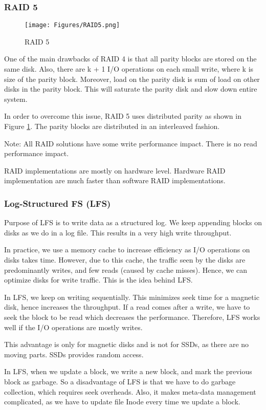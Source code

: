 \documentclass[twoside]{article}
\begin{document}
\subsubsection{RAID 5}
\begin{figure}[htbp]
\centering
\texttt{[image: Figures/RAID5.png]}
\caption{RAID 5} \label{fig:RAID5}
\end{figure}
One of the main drawbacks of RAID 4 is that all parity blocks are stored on the same disk. Also, there are k + 1 I/O operations on each small write, where k is size of the parity block. Moreover, load on the parity disk is sum of load on other disks in the parity block. This will saturate the parity disk and slow down entire system.

In order to overcome this issue, RAID 5 uses distributed parity as shown in Figure \ref{fig:RAID5}. The parity blocks are distributed in an interleaved fashion.

Note: All RAID solutions have some write performance impact. There is no read performance impact.

RAID implementations are mostly on hardware level. Hardware RAID implementation are much faster than software RAID implementations.

\subsubsection{Log-Structured FS (LFS)}
Purpose of LFS is to write data as a structured log. We keep appending blocks on disks as we do in a log file. This results in a very high write throughput.

In practice, we use a memory cache to increase efficiency as I/O operations on disks takes time. However, due to this cache, the traffic seen by the disks are predominantly writes, and few reads (caused by cache misses). Hence, we can optimize disks for write traffic. This is the idea behind LFS.

In LFS, we keep on writing sequentially. This minimizes seek time for a magnetic disk, hence increases the throughput. If a read comes after a write, we have to seek the block to be read which decreases the performance. Therefore, LFS works well if the I/O operations are mostly writes.

This advantage is only for magnetic disks and is not for SSDs, as there are no moving parts. SSDs provides random access.

In LFS, when we update a block, we write a new block, and mark the previous block as garbage. So a disadvantage of LFS is that we have to do garbage collection, which requires seek overheads. Also, it makes meta-data management complicated, as we have to update file Inode every time we update a block.
\end{document}
